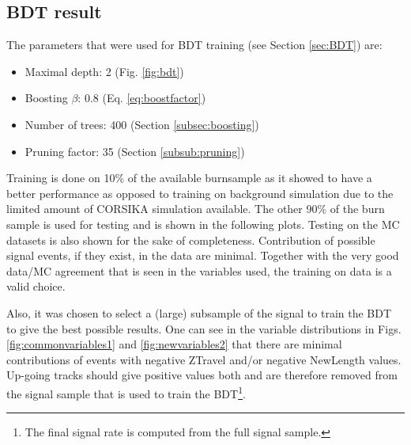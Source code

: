 \subsection{BDT result}
The parameters that were used for BDT training (see Section \ref{sec:BDT}) are:
\vspace{2mm}
\begin{itemize}
\item Maximal depth: 2 (Fig. \ref{fig:bdt})
\item Boosting $\beta$: 0.8 (Eq. \ref{eq:boostfactor})
\item Number of trees: 400 (Section \ref{subsec:boosting})
\item Pruning factor: 35 (Section \ref{subsub:pruning})
\end{itemize}
\vspace{2mm}
\noindent Training is done on 10\% of the available burnsample as it showed to have a better performance as opposed to training on background simulation due to the limited amount of CORSIKA simulation available. The other 90\% of the burn sample is used for testing and is shown in the following plots. Testing on the MC datasets is also shown for the sake of completeness. Contribution of possible signal events, if they exist, in the data are minimal. Together with the very good data/MC agreement that is seen in the variables used, the training on data is a valid choice.

Also, it was chosen to select a (large) subsample of the signal to train the BDT to give the best possible results. One can see in the variable distributions in Figs. \ref{fig:commonvariables1} and \ref{fig:newvariables2} that there are minimal contributions of events with negative ZTravel and/or negative NewLength values. Up-going tracks should give positive values both and are therefore removed from the signal sample that is used to train the BDT\footnote{The final signal rate is computed from the full signal sample.}.\\

